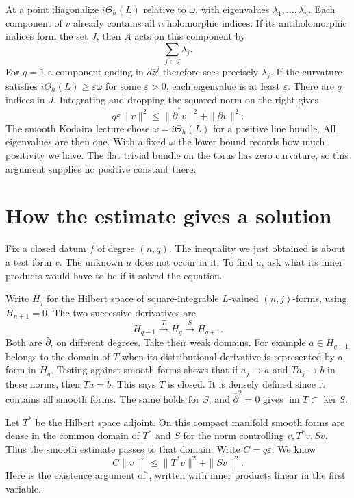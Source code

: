 At a point diagonalize $i\Theta_h(L)$
relative to $\omega$, with eigenvalues
$\lambda_1,\ldots,\lambda_n$. Each
component of $v$ already contains all $n$
holomorphic indices. If its antiholomorphic
indices form the set $J$, then $A$ acts
on this component by
$$
\sum_{j\in J}\lambda_j.
$$
For $q=1$ a component ending in
$d\bar z^j$ therefore sees precisely
$\lambda_j$. If the curvature satisfies
$i\Theta_h(L)\ge\varepsilon\omega$ for
some $\varepsilon>0$, each eigenvalue
is at least $\varepsilon$. There are $q$
indices in $J$. Integrating and dropping
the squared norm on the right gives
$$
q\varepsilon\|v\|^2\le
\|\bar\partial^*v\|^2+\|\bar\partial v\|^2.
$$
The smooth Kodaira lecture chose
$\omega=i\Theta_h(L)$ for a positive
line bundle. All eigenvalues are then
one. With a fixed $\omega$ the lower
bound records how much positivity we have.
The flat trivial bundle on the torus has
zero curvature, so this argument supplies
no positive constant there.

\section{How the estimate gives a solution}
\label{section-estimate-solution}

Fix a closed datum $f$ of degree $(n,q)$.
The inequality we just obtained is about a
test form $v$. The unknown $u$ does not
occur in it. To find $u$, ask what its
inner products would have to be if it
solved the equation.

Write $H_j$ for the Hilbert space of
square-integrable $L$-valued $(n,j)$-forms,
using $H_{n+1}=0$. The two successive
derivatives are
$$
H_{q-1}\xrightarrow{T}H_q
\xrightarrow{S}H_{q+1}.
$$
Both are $\bar\partial$, on different
degrees. Take their weak domains. For
example $a\in H_{q-1}$ belongs to the
domain of $T$ when its distributional
derivative is represented by a form in
$H_q$. Testing against smooth forms shows
that if $a_j\to a$ and $Ta_j\to b$ in
these norms, then $Ta=b$. This says $T$
is closed. It is densely defined since it
contains all smooth forms. The same holds
for $S$, and $\bar\partial^2=0$ gives
$\operatorname{im}T\subset\ker S$.

Let $T^*$ be the Hilbert space adjoint.
On this compact manifold smooth forms are
dense in the common domain of $T^*$ and
$S$ for the norm controlling $v,T^*v,Sv$.
Thus the smooth estimate passes to that
domain. Write $C=q\varepsilon$. We know
$$
C\|v\|^2\le\|T^*v\|^2+\|Sv\|^2.
$$
Here is the existence argument of
\cite[Theorem 5.1 and its proof]%
{demailly-cime}, written with inner
products linear in the first variable.

